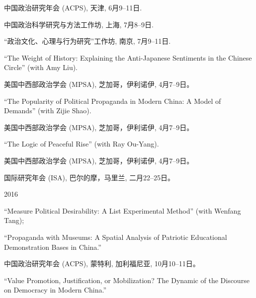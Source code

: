 \documentclass[10.5pt,]{article}
\providecommand{\tightlist}{%
	\setlength{\itemsep}{0pt}\setlength{\parskip}{0pt}}
\renewenvironment{itemize}{
	\begin{list}{}{
			\setlength{\leftmargin}{1.5em}
		}
	}{
	\end{list}
}
\begin{document}
\begin{itemize}
\begin{itemize}
    \begin{itemize}
    \tightlist
    \item
      \footnotesize 中国政治研究年会 (ACPS), 天津, 6月9--11日.
    \item
      \footnotesize 中国政治科学研究与方法工作坊, 上海, 7月8--9日.
    \item
      \footnotesize ``政治文化、心理与行为研究''工作坊, 南京,
      7月9--11日.
    \end{itemize}
  \item
    ``The Weight of History: Explaining the Anti-Japanese Sentiments in
    the Chinese Circle'' (with Amy Liu).

    \begin{itemize}
    \tightlist
    \item
      \footnotesize 美国中西部政治学会 (MPSA), 芝加哥，伊利诺伊,
      4月7--9日。
    \end{itemize}
  \item
    ``The Popularity of Political Propaganda in Modern China: A Model of
    Demands'' (with Zijie Shao).

    \begin{itemize}
    \tightlist
    \item
      \footnotesize 美国中西部政治学会 (MPSA), 芝加哥，伊利诺伊,
      4月7--9日。
    \end{itemize}
  \item
    ``The Logic of Peaceful Rise'' (with Ray Ou-Yang).

    \begin{itemize}
    \tightlist
    \item
      \footnotesize 美国中西部政治学会 (MPSA), 芝加哥，伊利诺伊,
      4月7--9日。
    \item
      \footnotesize 国际研究年会 (ISA), 巴尔的摩，马里兰, 二月22--25日。
    \end{itemize}
  \end{itemize}
\item
  2016

  \begin{itemize}
  \tightlist
  \item
    ``Measure Political Desirability: A List Experimental Method'' (with
    Wenfang Tang);
  \item
    ``Propaganda with Museums: A Spatial Analysis of Patriotic
    Educational Demonstration Bases in China.''

    \begin{itemize}
    \tightlist
    \item
      \footnotesize 中国政治研究年会 (ACPS), 蒙特利, 加利福尼亚,
      10月10--11日。
    \end{itemize}
  \item
    ``Value Promotion, Justification, or Mobilization? The Dynamic of
    the Discourse on Democracy in Modern China.''


\end{itemize}
\end{itemize}
\end{document}
